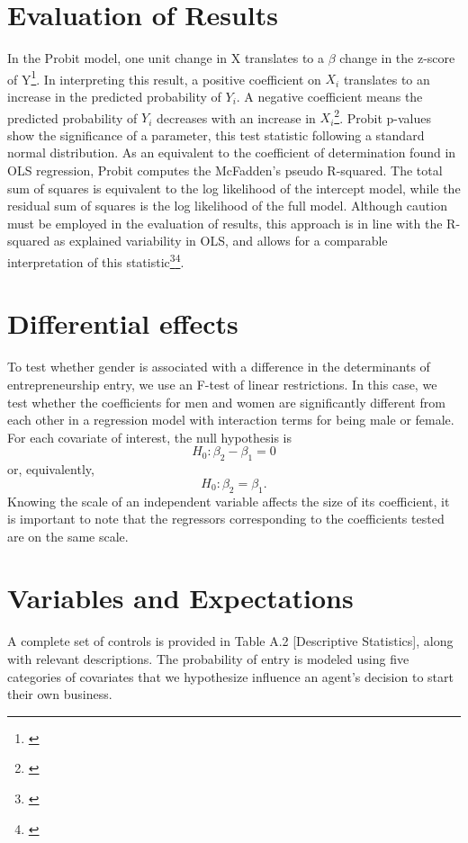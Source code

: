 \section{Evaluation of Results}

In the Probit model, one unit change in X translates to a $\beta$ change in the z-score of Y\footnote{\cite{AldrichNelson1984}}. In interpreting this result, a positive coefficient on $X_i$ translates to an increase in the predicted probability of $Y_i$. A negative coefficient means the predicted probability of $Y_i$ decreases with an increase in $X_i$\footnote{\cite{AldrichNelson1984}}. Probit p-values show the significance of a parameter, this test statistic following a standard normal distribution. As an equivalent to the coefficient of determination found in OLS regression, Probit computes the McFadden's pseudo R-squared. The total sum of squares is equivalent to the log likelihood of the intercept model, while the residual sum of squares is the log likelihood of the full model. Although caution must be employed in the evaluation of results, this approach is in line with the R-squared as explained variability in OLS, and allows for a comparable interpretation of this statistic\footnote{\cite{Hilbe1996}}\hspace{.2em}\footnote{\cite{Long1997}}. 

\section{Differential effects}

To test whether gender is associated with a difference in the determinants of entrepreneurship entry, we use an F-test of linear restrictions. In this case, we test whether the coefficients for men and women are significantly different from each other in a regression model with interaction terms for being male or female. For each covariate of interest, the null hypothesis is $$H_0 : \beta_{2} - \beta_{1} = 0$$ or, equivalently, $$H_0 : \beta_2 = \beta_1.$$ Knowing the scale of an independent variable affects the size of its coefficient, it is important to note that the regressors corresponding to the coefficients tested are on the same scale. 




\section{Variables and Expectations}

A complete set of controls is provided in Table A.2 [Descriptive Statistics], along with relevant descriptions. The probability of entry is modeled using five categories of covariates that we hypothesize influence an agent's decision to start their own business. 

